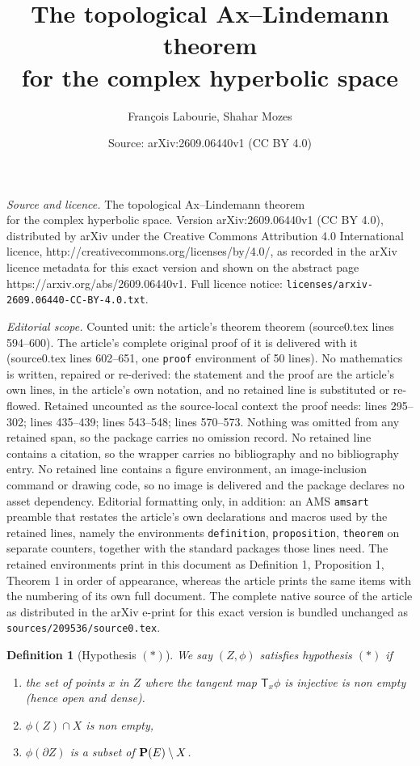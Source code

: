 \documentclass[10pt,a4paper]{amsart}
\title{The topological Ax--Lindemann theorem\\ for the complex hyperbolic space}
\author{Fran\c{c}ois Labourie, Shahar Mozes}
\date{Source: arXiv:2609.06440v1 (CC BY 4.0)}
\newtheorem{definition}{Definition}
\newcommand{\T}{\ms T}
\newcommand{\ms}{\mathsf}
\begin{document}
\maketitle

\noindent\emph{Source and licence.} The topological Ax--Lindemann theorem\\ for the complex hyperbolic space. Version arXiv:2609.06440v1 (CC BY 4.0), distributed by arXiv under the Creative Commons Attribution 4.0 International licence, http://creativecommons.org/licenses/by/4.0/, as recorded in the arXiv licence metadata for this exact version and shown on the abstract page https://arxiv.org/abs/2609.06440v1. Full licence notice: \texttt{licenses/arxiv-2609.06440-CC-BY-4.0.txt}.\par\smallskip

\noindent\textit{Editorial scope.} Counted unit: the article's theorem theorem (source0.tex lines 594--600). The article's complete original proof of it is delivered with it (source0.tex lines 602--651, one \texttt{proof} environment of 50 lines). No mathematics is written, repaired or re-derived: the statement and the proof are the article's own lines, in the article's own notation, and no retained line is substituted or re-flowed.  Retained uncounted as the source-local context the proof needs: lines 295--302; lines 435--439; lines 543--548; lines 570--573.  Nothing was omitted from any retained span, so the package carries no omission record.  No retained line contains a citation, so the wrapper carries no bibliography and no bibliography entry.  No retained line contains a figure environment, an image-inclusion command or drawing code, so no image is delivered and the package declares no asset dependency.  Editorial formatting only, in addition: an AMS \texttt{amsart} preamble that restates the article's own declarations and macros used by the retained lines, namely the environments \texttt{definition}, \texttt{proposition}, \texttt{theorem} on separate counters, together with the standard packages those lines need.  The retained environments print in this document as Definition 1, Proposition 1, Theorem 1 in order of appearance, whereas the article prints the same items with the numbering of its own full document.  The complete native source of the article as distributed in the arXiv e-print for this exact version is bundled unchanged as \texttt{sources/209536/source0.tex}.
\begin{definition}[\sc Hypothesis $(*)$]\label{sec:hypo*}
	We say $(Z,\phi)$  {\em satisfies hypothesis $(*)$} if  
\begin{enumerate}
	\item the set of  points $x$ in $Z$  where the tangent map  $\T_x\phi$ is injective is non empty (hence open and dense).	\item $\phi(Z)\cap X$ is non empty,
	\item $\phi(\partial Z)$ is a subset of ${\bf P}(E)\setminus X$.
\end{enumerate} 

\end{definition} 
\end{document}
